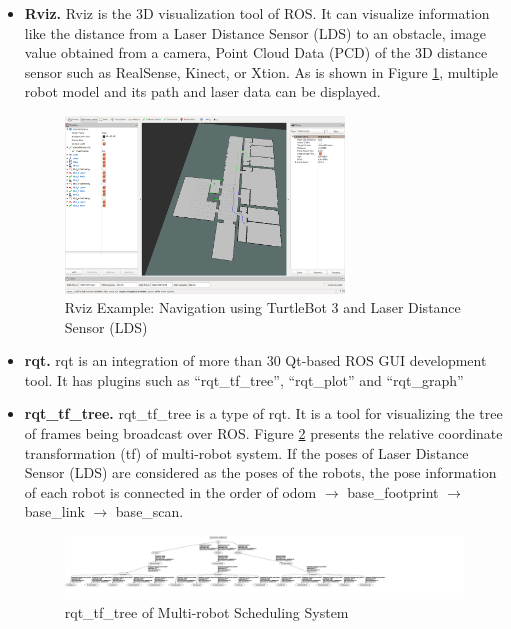 \begin{itemize}
    \item \textbf{Rviz.} Rviz\cite{RVIZ} is the 3D visualization tool of ROS. It can visualize information like the distance from a Laser Distance Sensor (LDS) to an obstacle, image value obtained from a camera, Point Cloud Data (PCD) of the 3D distance sensor such as RealSense, Kinect, or Xtion. As is shown in Figure \ref{fig:Rviz_gui}, multiple robot model and its path and laser data can be displayed.
    \begin{figure}[htbp]
        \centering
        \includegraphics[width = 0.7\textwidth]{content/images/ch2/Rviz_gui.png}
        \caption{Rviz Example: Navigation using TurtleBot 3 and Laser Distance Sensor (LDS)}
        \label{fig:Rviz_gui}
    \end{figure}

    \item \textbf{rqt.} rqt is an integration of more than 30 Qt-based ROS GUI development tool. It has plugins such as ``rqt\_tf\_tree'', ``rqt\_plot'' and  ``rqt\_graph''
   
    \item \textbf{rqt\_tf\_tree.} rqt\_tf\_tree is a type of rqt. It is a tool for visualizing the tree of frames being broadcast over ROS. Figure \ref{fig:tf_tree} presents the relative coordinate transformation (tf) of multi-robot system. If the poses of Laser Distance Sensor (LDS) are considered as the poses of the robots, the pose information of each robot is connected in the order of odom $\rightarrow$ base\_footprint $\rightarrow$ base\_link $\rightarrow$ base\_scan.
    
    \begin{figure}[htbp]
        \centering
        \includegraphics[width = 1.0\textwidth]{content/images/ch2/rqt_tree.png}
        \caption{rqt\_tf\_tree of Multi-robot Scheduling System}
        \label{fig:tf_tree}
        \end{figure}
       

\end{itemize}
